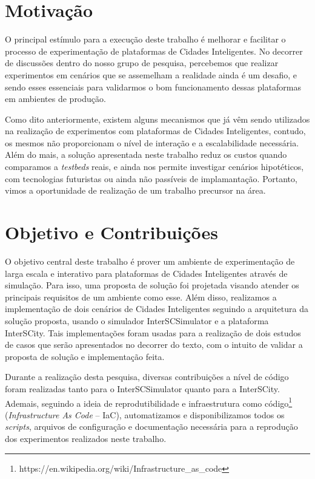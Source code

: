 \section{Motivação}

O principal estímulo para a execução deste trabalho é melhorar e facilitar o processo de experimentação de plataformas de Cidades Inteligentes.
No decorrer de discussões dentro do nosso grupo de pesquisa, percebemos que realizar experimentos em cenários que se assemelham a realidade ainda é um desafio, e sendo esses essenciais para validarmos o bom
funcionamento dessas plataformas em ambientes de produção.

Como dito anteriormente, existem alguns mecanismos que já vêm sendo utilizados na realização de experimentos com plataformas de Cidades Inteligentes, contudo, os mesmos não proporcionam o nível de interação
e a escalabilidade necessária.
Além do mais, a solução apresentada neste trabalho reduz os custos quando comparamos a \textit{testbeds} reais, e ainda nos permite investigar cenários hipotéticos, com tecnologias futuristas ou ainda não
passíveis de implamantação.
Portanto, vimos a oportunidade de realização de um trabalho precursor na área.

\section{Objetivo e Contribuições}

O objetivo central deste trabalho é prover um ambiente de experimentação de larga escala e interativo para plataformas de Cidades Inteligentes através de simulação.
Para isso, uma proposta de solução foi projetada visando atender os principais requisitos de um ambiente como esse.
Além disso, realizamos a implementação de dois cenários de Cidades Inteligentes seguindo a arquitetura da solução proposta, usando o simulador InterSCSimulator e a plataforma InterSCity.
Tais implementações foram usadas para a realização de dois estudos de casos que serão apresentados no decorrer do texto, com o intuito de validar a proposta de solução e implementação feita.

Durante a realização desta pesquisa, diversas contribuições a nível de código foram realizadas tanto para o InterSCSimulator quanto para a InterSCity.
Ademais, seguindo a ideia de reprodutibilidade e infraestrutura como código\footnote{https://en.wikipedia.org/wiki/Infrastructure\_as\_code} (\textit{Infrastructure As Code} -- IaC), automatizamos e
disponibilizamos todos os \textit{scripts}, arquivos de configuração e documentação necessária para a reprodução dos experimentos realizados neste trabalho.

